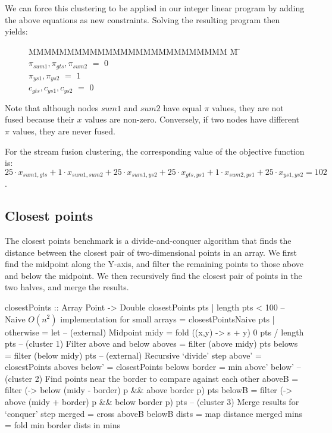 We can force this clustering to be applied in our integer linear program by adding the above equations as new constraints.
Solving the resulting program then yields:

\begin{figure}[h!]
\begin{tabbing}
MMMMMMMMMMMMMMMMMMMMMMMMMM \= M \= \kill
$\pi_{sum1}, \pi_{gts }, \pi_{sum2}$
    \> $=$ \> $0$ \\
$\pi_{ys1 }, \pi_{ys2 }$
    \> $=$ \> $1$ \\
$c_{gts}, c_{ys1}, c_{ys2}$           
    \> $=$ \> $0$
\end{tabbing}
\end{figure}
Note that although nodes $sum1$ and $sum2$ have equal $\pi$ values, they are not fused because their $x$ values are non-zero.
Conversely, if two nodes have different $\pi$ values, they are never fused. 

For the stream fusion clustering, the corresponding value of the objective function is: \\
$25 \cdot x_{sum1, gts} + 1 \cdot x_{sum1,sum2} + 25 \cdot x_{sum1, ys2} + 25 \cdot x_{gts, ys1} + 1 \cdot x_{sum2, ys1} + 25 \cdot x_{ys1, ys2} = 102$. 


\subsection{Closest points}
The closest points benchmark is a divide-and-conquer algorithm that finds the distance between the closest pair of two-dimensional points in an array.
We first find the midpoint along the Y-axis, and filter the remaining points to those above and below the midpoint.
We then recursively find the closest pair of points in the two halves, and merge the results.

\begin{haskell}[float,caption=Closest points benchmark,label=figs:clustering:bench:closest-points]
closestPoints :: Array Point -> Double
closestPoints pts
 | length pts < 100
 -- Naive $O(n^2)$ implementation for small arrays
 = closestPointsNaive pts
 | otherwise
 = let -- (external) Midpoint
       midy    = fold (\s (x,y) -> s + y) 0 pts / length pts
       -- (cluster 1) Filter above and below
       aboves  = filter (above midy) pts
       belows  = filter (below midy) pts
       -- (external) Recursive `divide' step
       above'  = closestPoints aboves
       below'  = closestPoints belows
       border  = min above' below'
       -- (cluster 2) Find points near the border to compare against each other
       aboveB  = filter (\p -> below (midy - border) p && above border p) pts
       belowB  = filter (\p -> above (midy + border) p && below border p) pts
       -- (cluster 3) Merge results for `conquer' step
       merged  = cross aboveB belowB
       dists   = map distance merged
       mins    = fold min border dists
   in  mins
\end{haskell}

